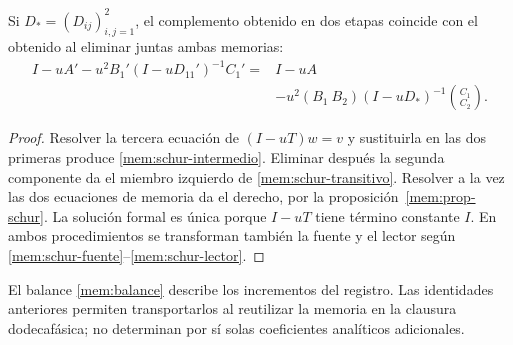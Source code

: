 \begin{proposition}
Si \(D_*=(D_{ij})_{i,j=1}^2\), el complemento obtenido en dos etapas
coincide con el obtenido al eliminar juntas ambas memorias:
\begin{equation}
 \begin{split}
 I-uA'-u^2B_1'(I-uD_{11}')^{-1}C_1'
 ={}&I-uA\\
 &-u^2(B_1\ B_2)(I-uD_*)^{-1}\binom{C_1}{C_2}.
 \end{split}
 \label{mem:schur-transitivo}
\end{equation}
\end{proposition}
\begin{proof}
Resolver la tercera ecuación de \((I-uT)w=v\) y sustituirla en las
dos primeras produce \eqref{mem:schur-intermedio}. Eliminar después la
segunda componente da el miembro izquierdo de
\eqref{mem:schur-transitivo}. Resolver a la vez las dos ecuaciones de
memoria da el derecho, por la proposición~\ref{mem:prop-schur}.
La solución formal es única porque \(I-uT\) tiene término constante
\(I\). En ambos procedimientos se transforman también la fuente y
el lector según \eqref{mem:schur-fuente}--\eqref{mem:schur-lector}.
\end{proof}

El balance \eqref{mem:balance} describe los incrementos del registro.
Las identidades anteriores permiten transportarlos al reutilizar la memoria
en la clausura dodecafásica; no determinan por sí solas coeficientes
analíticos adicionales.
